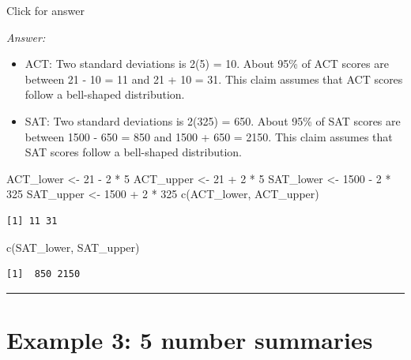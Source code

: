 \documentclass[
]{book}
\newenvironment{Shaded}{\begin{snugshade}}{\end{snugshade}}
\newcommand{\DecValTok}[1]{\textcolor[rgb]{0.00,0.00,0.81}{#1}}
\newcommand{\FunctionTok}[1]{\textcolor[rgb]{0.00,0.00,0.00}{#1}}
\newcommand{\NormalTok}[1]{#1}
\newcommand{\OtherTok}[1]{\textcolor[rgb]{0.56,0.35,0.01}{#1}}
\newcommand{\SpecialCharTok}[1]{\textcolor[rgb]{0.00,0.00,0.00}{#1}}
\providecommand{\tightlist}{%
  \setlength{\itemsep}{0pt}\setlength{\parskip}{0pt}}
\begin{document}
Click for answer

\emph{Answer:}

\begin{itemize}
\tightlist
\item
  ACT: Two standard deviations is 2(5) = 10. About 95\% of ACT scores are between 21 - 10 = 11
  and 21 + 10 = 31. This claim assumes that ACT scores follow a bell-shaped distribution.
\item
  SAT: Two standard deviations is 2(325) = 650. About 95\% of SAT scores are between 1500 - 650 =
  850 and 1500 + 650 = 2150. This claim assumes that SAT scores follow a bell-shaped distribution.
\end{itemize}

\begin{Shaded}
\begin{Highlighting}[]
\NormalTok{ACT\_lower }\OtherTok{\textless{}{-}} \DecValTok{21} \SpecialCharTok{{-}} \DecValTok{2} \SpecialCharTok{*} \DecValTok{5}
\NormalTok{ACT\_upper }\OtherTok{\textless{}{-}} \DecValTok{21} \SpecialCharTok{+} \DecValTok{2} \SpecialCharTok{*} \DecValTok{5}
\NormalTok{SAT\_lower }\OtherTok{\textless{}{-}} \DecValTok{1500} \SpecialCharTok{{-}} \DecValTok{2} \SpecialCharTok{*} \DecValTok{325}
\NormalTok{SAT\_upper }\OtherTok{\textless{}{-}} \DecValTok{1500} \SpecialCharTok{+} \DecValTok{2} \SpecialCharTok{*} \DecValTok{325}
\FunctionTok{c}\NormalTok{(ACT\_lower, ACT\_upper)}
\end{Highlighting}
\end{Shaded}

\begin{verbatim}
[1] 11 31
\end{verbatim}

\begin{Shaded}
\begin{Highlighting}[]
\FunctionTok{c}\NormalTok{(SAT\_lower, SAT\_upper)}
\end{Highlighting}
\end{Shaded}

\begin{verbatim}
[1]  850 2150
\end{verbatim}

\begin{center}\rule{0.5\linewidth}{0.5pt}\end{center}

\hypertarget{example-3-5-number-summaries}{%
\section{Example 3: 5 number summaries}\label{example-3-5-number-summaries}}
\end{document}
